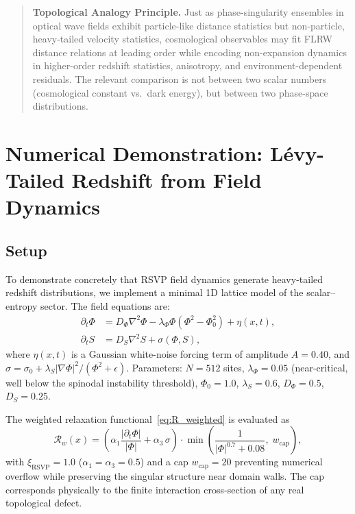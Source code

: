 \documentclass[12pt,a4paper]{article}
\theoremstyle{remark}
\begin{document}
\begin{quote}
\textbf{Topological Analogy Principle.}
Just as phase-singularity ensembles in optical wave fields exhibit
particle-like distance statistics but non-particle, heavy-tailed velocity
statistics, cosmological observables may fit FLRW distance relations at leading
order while encoding non-expansion dynamics in higher-order redshift statistics,
anisotropy, and environment-dependent residuals. The relevant comparison is not
between two scalar numbers (cosmological constant vs.\ dark energy), but between
two phase-space distributions.
\end{quote}



\section{Numerical Demonstration: Lévy-Tailed Redshift from Field Dynamics}
\label{app:simulation}

\subsection{Setup}

To demonstrate concretely that RSVP field dynamics generate heavy-tailed
redshift distributions, we implement a minimal 1D lattice model of the
scalar--entropy sector. The field equations are:
\begin{align}
\partial_t \Phi &= D_\Phi \nabla^2\Phi - \lambda_\Phi\Phi(\Phi^2 - \Phi_0^2) + \eta(x,t), \\
\partial_t S    &= D_S\nabla^2 S + \sigma(\Phi, S),
\end{align}
where $\eta(x,t)$ is a Gaussian white-noise forcing term of amplitude
$A = 0.40$, and $\sigma = \sigma_0 + \lambda_S|\nabla\Phi|^2/(\Phi^2 + \epsilon)$.
Parameters: $N = 512$ sites, $\lambda_\Phi = 0.05$ (near-critical, well below
the spinodal instability threshold), $\Phi_0 = 1.0$, $\lambda_S = 0.6$,
$D_\Phi = 0.5$, $D_S = 0.25$.

The weighted relaxation functional~\eqref{eq:R_weighted} is evaluated as
\begin{equation}
\mathcal{R}_w(x) = \left(\alpha_1\frac{|\partial_t\Phi|}{|\Phi|}
+ \alpha_3\,\sigma\right) \cdot
\min\!\left(\frac{1}{|\Phi|^{0.7} + 0.08},\; w_{\mathrm{cap}}\right),
\end{equation}
with $\xi_{\mathrm{RSVP}} = 1.0$ ($\alpha_1 = \alpha_3 = 0.5$) and a cap
$w_{\mathrm{cap}} = 20$ preventing numerical overflow while preserving the
singular structure near domain walls. The cap corresponds physically to
the finite interaction cross-section of any real topological defect.
\end{document}
